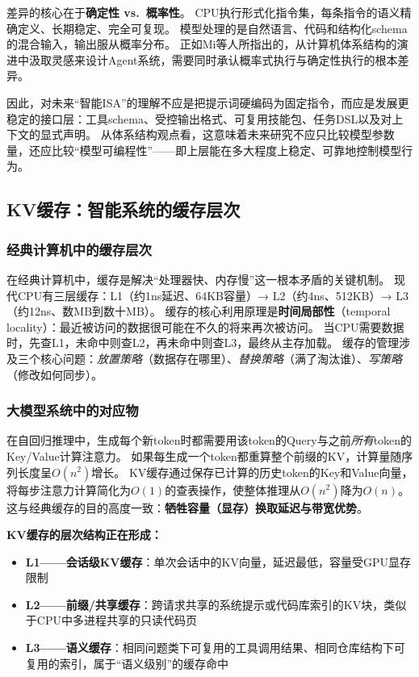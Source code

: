 差异的核心在于\textbf{确定性 vs.\ 概率性}。
CPU执行形式化指令集，每条指令的语义精确定义、长期稳定、完全可复现。
模型处理的是自然语言、代码和结构化schema的混合输入，输出服从概率分布。
正如Mi等人所指出的，从计算机体系结构的演进中汲取灵感来设计Agent系统，需要同时承认概率式执行与确定性执行的根本差异\cite{mi2025llmagentscomputersystems}。

因此，对未来``智能ISA''的理解不应是把提示词硬编码为固定指令，而应是发展更稳定的接口层：工具schema、受控输出格式、可复用技能包、任务DSL以及对上下文的显式声明。
从体系结构观点看，这意味着未来研究不应只比较模型参数量，还应比较``模型可编程性''——即上层能在多大程度上稳定、可靠地控制模型行为。

\subsection{KV缓存：智能系统的缓存层次}
\label{sec:kv}

\subsubsection{经典计算机中的缓存层次}

在经典计算机中，缓存是解决``处理器快、内存慢''这一根本矛盾的关键机制\cite{drepper2007memory}。
现代CPU有三层缓存：L1（约1ns延迟、64KB容量）→ L2（约4ns、512KB）→ L3（约12ns、数MB到数十MB）。
缓存的核心利用原理是\textbf{时间局部性}（temporal locality）：最近被访问的数据很可能在不久的将来再次被访问。
当CPU需要数据时，先查L1，未命中则查L2，再未命中则查L3，最终从主存加载。
缓存的管理涉及三个核心问题：\textit{放置策略}（数据存在哪里）、\textit{替换策略}（满了淘汰谁）、\textit{写策略}（修改如何同步）。

\subsubsection{大模型系统中的对应物}

在自回归推理中，生成每个新token时都需要用该token的Query与之前\textit{所有}token的Key/Value计算注意力。
如果每生成一个token都重算整个前缀的KV，计算量随序列长度呈$O(n^2)$增长。
KV缓存通过保存已计算的历史token的Key和Value向量，将每步注意力计算简化为$O(1)$的查表操作，使整体推理从$O(n^2)$降为$O(n)$。
这与经典缓存的目的高度一致：\textbf{牺牲容量（显存）换取延迟与带宽优势}\cite{drepper2007memory,kwon2023pagedattention}。

\textbf{KV缓存的层次结构正在形成：}
\begin{itemize}[nosep]
\item \textbf{L1——会话级KV缓存}：单次会话中的KV向量，延迟最低，容量受GPU显存限制
\item \textbf{L2——前缀/共享缓存}：跨请求共享的系统提示或代码库索引的KV块，类似于CPU中多进程共享的只读代码页\cite{vllm_prefix_2026,sglang_docs_2026,gim2024promptcache}
\item \textbf{L3——语义缓存}：相同问题类下可复用的工具调用结果、相同仓库结构下可复用的索引，属于``语义级别''的缓存命中
\end{itemize}

